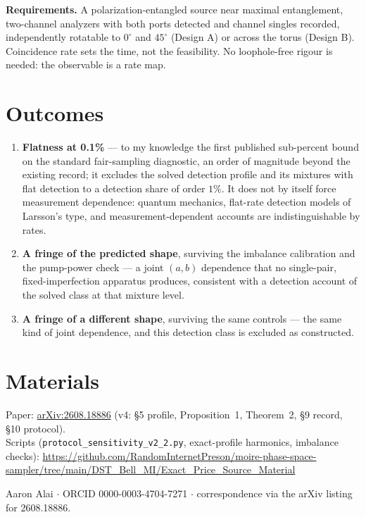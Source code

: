 \documentclass[10pt]{article}
\begin{document}
\textbf{Requirements.} A polarization-entangled source near maximal entanglement, two-channel analyzers with both ports detected and channel singles recorded, independently rotatable to $0^\circ$ and $45^\circ$ (Design A) or across the torus (Design B). Coincidence rate sets the time, not the feasibility. No loophole-free rigour is needed: the observable is a rate map.

\section*{Outcomes}
\begin{enumerate}[nosep]
\item \textbf{Flatness at 0.1\%} --- to my knowledge the first published sub-percent bound on the standard fair-sampling diagnostic, an order of magnitude beyond the existing record; it excludes the solved detection profile and its mixtures with flat detection to a detection share of order $1\%$. It does not by itself force measurement dependence: quantum mechanics, flat-rate detection models of Larsson's type, and measurement-dependent accounts are indistinguishable by rates.
\item \textbf{A fringe of the predicted shape}, surviving the imbalance calibration and the pump-power check --- a joint $(a,b)$ dependence that no single-pair, fixed-imperfection apparatus produces, consistent with a detection account of the solved class at that mixture level.
\item \textbf{A fringe of a different shape}, surviving the same controls --- the same kind of joint dependence, and this detection class is excluded as constructed.
\end{enumerate}

\section*{Materials}
Paper: \href{https://arxiv.org/abs/2608.18886}{arXiv:2608.18886} (v4: \S5 profile, Proposition~1, Theorem~2, \S9 record, \S10 protocol).\\
Scripts (\texttt{protocol\_sensitivity\_v2\_2.py}, exact-profile harmonics, imbalance checks): \url{https://github.com/RandomInternetPreson/moire-phase-space-sampler/tree/main/DST_Bell_MI/Exact_Price_Source_Material}

\medskip
\noindent Aaron Alai $\cdot$ ORCID 0000-0003-4704-7271 $\cdot$ correspondence via the arXiv listing for 2608.18886.
\end{document}
